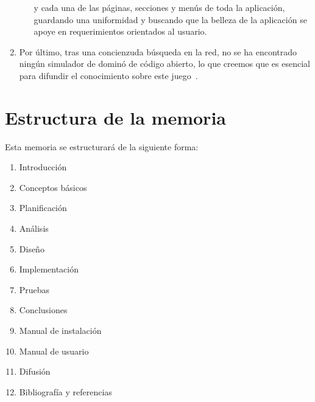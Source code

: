 \begin{enumerate}
\begin{itemize}
                        y cada una de las páginas, secciones y menús de toda la aplicación, guardando
                        una uniformidad y buscando que la belleza de la aplicación se apoye en
                        requerimientos orientados al usuario.
            \end{itemize}
    \item Por último, tras una concienzuda búsqueda en la red, no se
      ha encontrado ningún simulador de dominó de código abierto, lo
      que creemos que es esencial para difundir el conocimiento sobre
      este juego~\cite{stallman2004software}.
\end{enumerate}

\section{Estructura de la memoria}

Esta memoria se estructurará de la siguiente forma:

\begin{enumerate}
    \item Introducción
    \item Conceptos básicos
    \item Planificación
    \item Análisis
    \item Diseño
    \item Implementación
    \item Pruebas
    \item Conclusiones
    \item Manual de instalación
    \item Manual de usuario
    \item Difusión
    \item Bibliografía y referencias
\end{enumerate}
